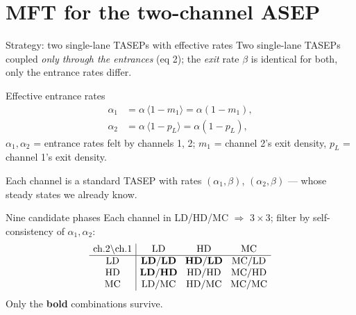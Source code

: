 \documentclass[aspectratio=169,10pt]{beamer}
\begin{document}
\section{MFT for the two-channel ASEP}
\begin{frame}{Strategy: two single-lane TASEPs with effective rates}
  \footnotesize
  \setlength{\abovedisplayskip}{2pt}
  \setlength{\belowdisplayskip}{2pt}
  Two single-lane TASEPs coupled \emph{only through the entrances} (eq 2);
  the \emph{exit} rate $\beta$ is identical for both, only the entrance rates
  differ.
  \begin{block}{Effective entrance rates}
    \footnotesize
    \begin{align*}
      \alpha_1 &= \alpha\,\langle 1 - m_1\rangle = \alpha (1 - m_1), \\
      \alpha_2 &= \alpha\,\langle 1 - p_L\rangle = \alpha (1 - p_L),
    \end{align*}
    $\alpha_1,\alpha_2$ = entrance rates felt by channels 1, 2; $m_1$ =
    channel 2's exit density, $p_L$ = channel 1's exit density.
  \end{block}
  Each channel is a standard TASEP with rates $(\alpha_1,\beta)$,
  $(\alpha_2,\beta)$ --- whose steady states we already know.
  \begin{block}{Nine candidate phases}
    \scriptsize
    Each channel in LD/HD/MC $\Rightarrow$ $3\times3$; filter by
    self-consistency of $\alpha_1,\alpha_2$:
    \[
      \setlength{\arraycolsep}{4pt}
      \begin{array}{c|ccc}
        \text{ch.2} \backslash \text{ch.1} & \mathrm{LD} & \mathrm{HD} & \mathrm{MC}\\
        \hline
        \mathrm{LD} & \mathbf{LD/LD} & \mathbf{HD/LD} & \mathrm{MC/LD}\\
        \mathrm{HD} & \mathbf{LD/HD} & \mathrm{HD/HD} & \mathrm{MC/HD}\\
        \mathrm{MC} & \mathrm{LD/MC} & \mathrm{HD/MC} & \mathrm{MC/MC}
      \end{array}
    \]
    Only the \textbf{bold} combinations survive.
  \end{block}
\end{frame}
\end{document}

